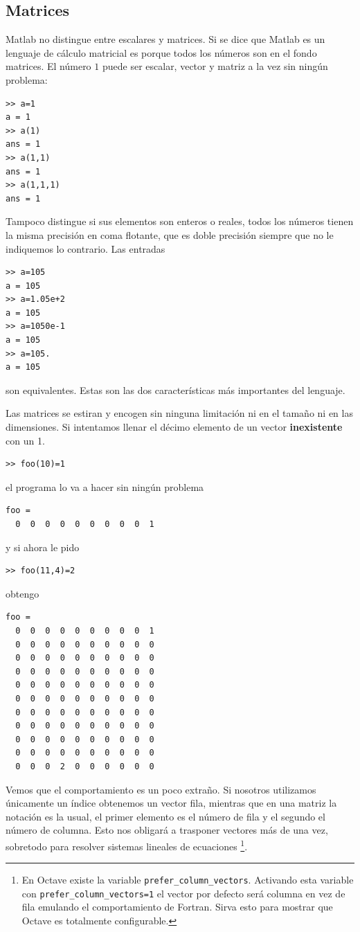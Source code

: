 \subsection{Matrices}

Matlab no distingue entre escalares y matrices. Si se dice que Matlab
es un lenguaje de cálculo matricial es porque todos los números son en
el fondo matrices. El número $1$ puede ser escalar, vector y matriz a
la vez sin ningún problema:

\begin{lstlisting}
>> a=1
a = 1
>> a(1)
ans = 1
>> a(1,1)
ans = 1
>> a(1,1,1)
ans = 1
\end{lstlisting}
Tampoco distingue si sus elementos son enteros o reales, todos los
números tienen la misma precisión en coma flotante, que es doble
precisión siempre que no le indiquemos lo contrario. Las entradas

\begin{lstlisting}
>> a=105
a = 105
>> a=1.05e+2
a = 105
>> a=1050e-1
a = 105
>> a=105.
a = 105
\end{lstlisting}

son equivalentes. Estas son las dos características más importantes
del lenguaje.

Las matrices se estiran y encogen sin ninguna limitación ni en el
tamaño ni en las dimensiones. Si intentamos llenar el décimo elemento
de un vector \textbf{inexistente} con un 1.

\begin{lstlisting}
>> foo(10)=1
\end{lstlisting}
el programa lo va a hacer sin ningún problema

\begin{lstlisting}
foo =   
  0  0  0  0  0  0  0  0  0  1
\end{lstlisting}
y si ahora le pido

\begin{lstlisting}
>> foo(11,4)=2
\end{lstlisting}
obtengo

\begin{lstlisting}
foo =   
  0  0  0  0  0  0  0  0  0  1   
  0  0  0  0  0  0  0  0  0  0   
  0  0  0  0  0  0  0  0  0  0   
  0  0  0  0  0  0  0  0  0  0   
  0  0  0  0  0  0  0  0  0  0   
  0  0  0  0  0  0  0  0  0  0   
  0  0  0  0  0  0  0  0  0  0   
  0  0  0  0  0  0  0  0  0  0   
  0  0  0  0  0  0  0  0  0  0   
  0  0  0  0  0  0  0  0  0  0   
  0  0  0  2  0  0  0  0  0  0
\end{lstlisting}
Vemos que el comportamiento es un poco extraño. Si nosotros utilizamos
únicamente un índice obtenemos un vector fila, mientras que en una
matriz la notación es la usual, el primer elemento es el número de
fila y el segundo el número de columna. Esto nos obligará a trasponer
vectores más de una vez, sobretodo para resolver sistemas lineales de
ecuaciones%
\footnote{En Octave existe la variable
  \texttt{prefer\_column\_vectors}. Activando esta variable con
  \texttt{prefer\_column\_vectors=1} el vector por defecto será
  columna en vez de fila emulando el comportamiento de Fortran. Sirva
  esto para mostrar que Octave es totalmente configurable.%
}.

